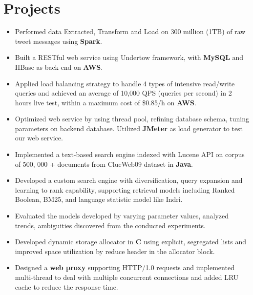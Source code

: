 \documentclass{resume}
\begin{document}
\section{Projects}
\begin{itemize}
\item{Performed data Extracted, Transform and Load on 300 million (1TB) of raw tweet messages using \textbf{Spark}.}
\item{Built a RESTful web service using Undertow framework, with \textbf{MySQL} and HBase as back-end on \textbf{AWS}.}
\item{Applied load balancing strategy to handle 4 types of intensive read/write queries and achieved an average of 10,000 QPS (queries per second) in 2 hours live test, within a maximum cost of \$0.85/h on \textbf{AWS}.}
\item{Optimized web service by using thread pool, refining database schema, tuning parameters on backend database. Utilized \textbf{JMeter} as load generator to test our web service.}
\end{itemize}
\begin{itemize}
\item{Implemented a text-based search engine indexed with Lucene API on corpus of 500, 000 + documents from ClueWeb09 dataset in \textbf{Java}.}
\item{Developed a custom search engine with diversification, query expansion and learning to rank capability, supporting retrieval models including Ranked Boolean, BM25, and language statistic model like Indri.}
\item{Evaluated the models developed by varying parameter values, analyzed trends, ambiguities discovered from the conducted experiments.}
\end{itemize}
\begin{itemize}
\item{Developed dynamic storage allocator in \textbf{C} using explicit, segregated lists and improved space utilization by reduce header in the allocator block.}
\item{Designed a \textbf{web proxy} supporting HTTP/1.0 requests and implemented multi-thread to deal with multiple concurrent connections and added LRU cache to reduce the response time.}
\end{itemize}
\end{document}
